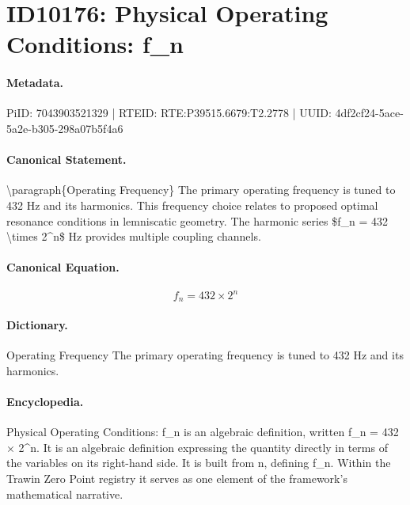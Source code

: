 \section*{ID10176: Physical Operating Conditions: f\_n}
\paragraph{Metadata.}
PiID: 7043903521329 | RTEID: RTE:P39515.6679:T2.2778 | UUID: 4df2cf24-5ace-5a2e-b305-298a07b5f4a6

\paragraph{Canonical Statement.}
\textbackslash{}paragraph\{Operating Frequency\} The primary operating frequency is tuned to 432 Hz and its harmonics. This frequency choice relates to proposed optimal resonance conditions in lemniscatic geometry. The harmonic series \$f\_n = 432 \textbackslash{}times 2\textasciicircum{}n\$ Hz provides multiple coupling channels.

\paragraph{Canonical Equation.}
\[
f_n = 432 \times 2^n
\]

\paragraph{Dictionary.}
Operating Frequency The primary operating frequency is tuned to 432 Hz and its harmonics.

\paragraph{Encyclopedia.}
Physical Operating Conditions: f\_n is an algebraic definition, written f\_n = 432 × 2\textasciicircum{}n. It is an algebraic definition expressing the quantity directly in terms of the variables on its right-hand side. It is built from n, defining f\_n. Within the Trawin Zero Point registry it serves as one element of the framework's mathematical narrative.
